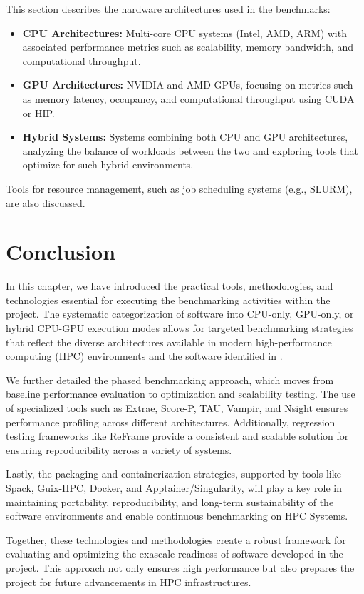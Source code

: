 This section describes the hardware architectures used in the benchmarks:
\begin{itemize}
    \item \textbf{CPU Architectures:} Multi-core CPU systems (Intel, AMD, ARM) with associated performance metrics such as scalability, memory bandwidth, and computational throughput.
    \item \textbf{GPU Architectures:} NVIDIA and AMD GPUs, focusing on metrics such as memory latency, occupancy, and computational throughput using CUDA or HIP.
    \item \textbf{Hybrid Systems:} Systems combining both CPU and GPU architectures, analyzing the balance of workloads between the two and exploring tools that optimize for such hybrid environments.
\end{itemize}
Tools for resource management, such as job scheduling systems (e.g., SLURM), are also discussed.

\section{Conclusion}
\label{sec:Technology-conclusion}

In this chapter, we have introduced the practical tools, methodologies, and technologies essential for executing the benchmarking activities within the \exama project. 
The systematic categorization of software into CPU-only, GPU-only, or hybrid CPU-GPU execution modes allows for targeted benchmarking strategies that reflect the diverse architectures available in modern high-performance computing (HPC) environments and the software identified in \exama.

We further detailed the phased benchmarking approach, which moves from baseline performance evaluation to optimization and scalability testing. The use of specialized tools such as Extrae, Score-P, TAU, Vampir, and Nsight ensures performance profiling across different architectures. Additionally, regression testing frameworks like ReFrame provide a consistent and scalable solution for ensuring reproducibility across a variety of systems.

Lastly, the packaging and containerization strategies, supported by tools like Spack, Guix-HPC, Docker, and Apptainer/Singularity, will play a key role in maintaining portability, reproducibility, and long-term sustainability of the software environments and enable continuous benchmarking on HPC Systems.

Together, these technologies and methodologies create a robust framework for evaluating and optimizing the exascale readiness of software developed in the \exama project. This approach not only ensures high performance but also prepares the project for future advancements in HPC infrastructures.

